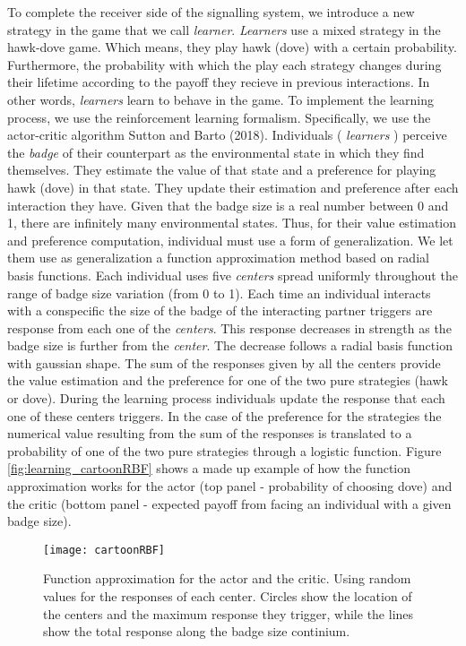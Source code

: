\documentclass[]{article}
\begin{document}
To complete the receiver side of the signalling system, we introduce a
new strategy in the game that we call \emph{learner}. \emph{Learners}
use a mixed strategy in the hawk-dove game. Which means, they play hawk
(dove) with a certain probability. Furthermore, the probability with
which the play each strategy changes during their lifetime according to
the payoff they recieve in previous interactions. In other words,
\emph{learners} learn to behave in the game. To implement the learning
process, we use the reinforcement learning formalism. Specifically, we
use the actor-critic algorithm Sutton and Barto (2018). Individuals (
\emph{learners} ) perceive the \emph{badge} of their counterpart as the
environmental state in which they find themselves. They estimate the
value of that state and a preference for playing hawk (dove) in that
state. They update their estimation and preference after each
interaction they have. Given that the badge size is a real number
between 0 and 1, there are infinitely many environmental states. Thus,
for their value estimation and preference computation, individual must
use a form of generalization. We let them use as generalization a
function approximation method based on radial basis functions. Each
individual uses five \emph{centers} spread uniformly throughout the
range of badge size variation (from 0 to 1). Each time an individual
interacts with a conspecific the size of the badge of the interacting
partner triggers are response from each one of the \emph{centers}. This
response decreases in strength as the badge size is further from the
\emph{center}. The decrease follows a radial basis function with
gaussian shape. The sum of the responses given by all the centers
provide the value estimation and the preference for one of the two pure
strategies (hawk or dove). During the learning process individuals
update the response that each one of these centers triggers. In the case
of the preference for the strategies the numerical value resulting from
the sum of the responses is translated to a probability of one of the
two pure strategies through a logistic function. Figure
\ref{fig:learning_cartoonRBF} shows a made up example of how the
function approximation works for the actor (top panel - probability of
choosing dove) and the critic (bottom panel - expected payoff from
facing an individual with a given badge size).

\begin{figure}
\texttt{[image: cartoonRBF]} \caption{\label{fig:learning_cartoonRBF}Function approximation for the actor and the critic. Using random values for the responses of each center. Circles show the location of the centers and the maximum response they trigger, while the lines show the total response along the badge size continium.}\label{fig:fig2}
\end{figure}
\end{document}
